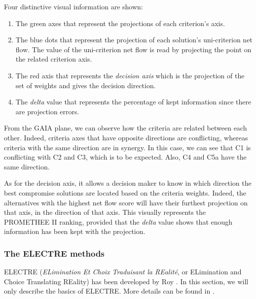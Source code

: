 \begin{enumerate}
Four distinctive visual information are shown:
\begin{enumerate}
\item The green axes that represent the projections of each criterion's axis.
\item The blue dots that represent the projection of each solution's uni-criterion net flow. The value of the uni-criterion net flow is read by projecting the point on the related criterion axis.
\item The red axis that represents the \textit{decision axis} which is the projection of the set of weights and gives the decision direction.
\item The \textit{delta} value that represents the percentage of kept information since there are projection errors.
\end{enumerate}

From the GAIA plane, we can observe how the criteria are related between each other. Indeed, criteria axes that have opposite directions are conflicting, whereas criteria with the same direction are in synergy. In this case, we can see that C1 is conflicting with C2 and C3, which is to be expected. Also, C4 and C5a have the same direction.

As for the decision axis, it allows a decision maker to know in which direction the best compromise solutions are located based on the criteria weights. Indeed, the alternatives with the highest net flow score will have their furthest projection on that axis, in the direction of that axis. This visually represents the PROMETHEE II ranking, provided that the \textit{delta} value shows that enough information has been kept with the projection.

\end{enumerate}

\subsubsection{The ELECTRE methods}
ELECTRE (\textit{ELimination Et Choix Traduisant la REalité}, or ELimination and Choice Translating REality) has been developed by Roy \cite{Roy66}. In this section, we will only describe the basics of ELECTRE. More details can be found in \cite{electre}.

